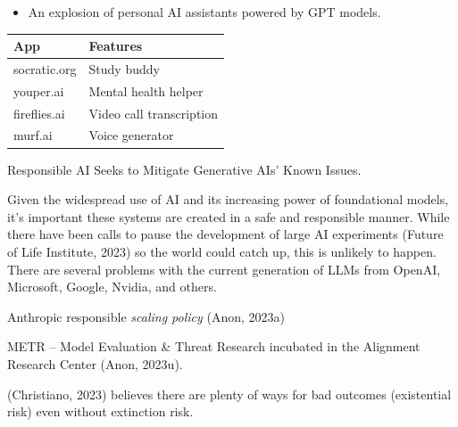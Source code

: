 \documentclass[
  letterpaper,
  DIV=11,
  numbers=noendperiod]{scrartcl}
\providecommand{\tightlist}{%
  \setlength{\itemsep}{0pt}\setlength{\parskip}{0pt}}\usepackage{longtable,booktabs,array}
\begin{document}
\begin{itemize}
\tightlist
\item
  An explosion of personal AI assistants powered by GPT models.
\end{itemize}

\begin{longtable}[]{@{}ll@{}}
\toprule\noalign{}
App & Features \\
\midrule\noalign{}
\endhead
\bottomrule\noalign{}
\endlastfoot
socratic.org & Study buddy \\
youper.ai & Mental health helper \\
fireflies.ai & Video call transcription \\
murf.ai & Voice generator \\
\end{longtable}

Responsible AI Seeks to Mitigate Generative AIs' Known Issues.

Given the widespread use of AI and its increasing power of foundational
models, it's important these systems are created in a safe and
responsible manner. While there have been calls to pause the development
of large AI experiments (Future of Life Institute, 2023) so the world
could catch up, this is unlikely to happen. There are several problems
with the current generation of LLMs from OpenAI, Microsoft, Google,
Nvidia, and others.

Anthropic responsible \emph{scaling policy} (Anon, 2023a)

METR -- Model Evaluation \& Threat Research incubated in the Alignment
Research Center (Anon, 2023u).

(Christiano, 2023) believes there are plenty of ways for bad outcomes
(existential risk) even without extinction risk.
\end{document}
